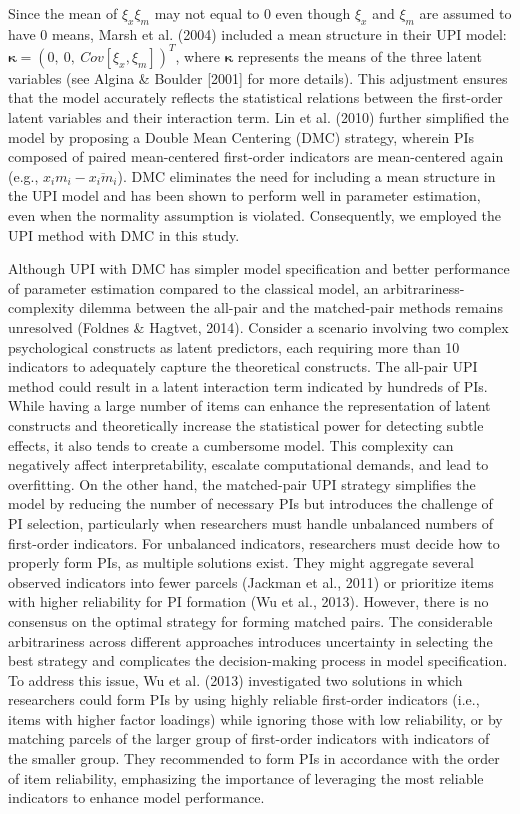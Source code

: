 \documentclass[
  man,mask]{apa6}
\begin{document}
Since the mean of \(\xi_{x}\xi_{m}\) may not equal to 0 even though \(\xi_{x}\) and \(\xi_{m}\) are assumed to have 0 means, Marsh et al. (2004) included a mean structure in their UPI model: \(\mathbf{\kappa} = (0,\ 0,\ Cov[\xi_{x}, \xi_{m}])^T\), where \(\mathbf{\kappa}\) represents the means of the three latent variables (see Algina \& Boulder {[}2001{]} for more details). This adjustment ensures that the model accurately reflects the statistical relations between the first-order latent variables and their interaction term. Lin et al. (2010) further simplified the model by proposing a Double Mean Centering (DMC) strategy, wherein PIs composed of paired mean-centered first-order indicators are mean-centered again (e.g., \(x_{i}m_{i} - \overline{x_{i}m_{i}}\)). DMC eliminates the need for including a mean structure in the UPI model and has been shown to perform well in parameter estimation, even when the normality assumption is violated. Consequently, we employed the UPI method with DMC in this study.

Although UPI with DMC has simpler model specification and better performance of parameter estimation compared to the classical model, an arbitrariness-complexity dilemma between the all-pair and the matched-pair methods remains unresolved (Foldnes \& Hagtvet, 2014). Consider a scenario involving two complex psychological constructs as latent predictors, each requiring more than 10 indicators to adequately capture the theoretical constructs. The all-pair UPI method could result in a latent interaction term indicated by hundreds of PIs. While having a large number of items can enhance the representation of latent constructs and theoretically increase the statistical power for detecting subtle effects, it also tends to create a cumbersome model. This complexity can negatively affect interpretability, escalate computational demands, and lead to overfitting. On the other hand, the matched-pair UPI strategy simplifies the model by reducing the number of necessary PIs but introduces the challenge of PI selection, particularly when researchers must handle unbalanced numbers of first-order indicators. For unbalanced indicators, researchers must decide how to properly form PIs, as multiple solutions exist. They might aggregate several observed indicators into fewer parcels (Jackman et al., 2011) or prioritize items with higher reliability for PI formation (Wu et al., 2013). However, there is no consensus on the optimal strategy for forming matched pairs. The considerable arbitrariness across different approaches introduces uncertainty in selecting the best strategy and complicates the decision-making process in model specification. To address this issue, Wu et al. (2013) investigated two solutions in which researchers could form PIs by using highly reliable first-order indicators (i.e., items with higher factor loadings) while ignoring those with low reliability, or by matching parcels of the larger group of first-order indicators with indicators of the smaller group. They recommended to form PIs in accordance with the order of item reliability, emphasizing the importance of leveraging the most reliable indicators to enhance model performance.
\end{document}

